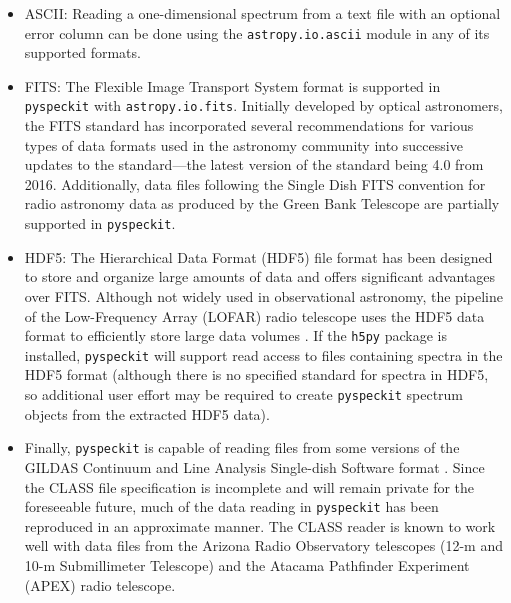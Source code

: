 \documentclass[twocolumn]{aastex62}
\newcommand{\pyspeckit}{\texttt{pyspeckit}\xspace}
\begin{document}
\begin{itemize}
    \item ASCII: Reading a one-dimensional spectrum from a text file with an optional
        error column can
	be done using the \texttt{astropy.io.ascii} module in any of its supported
	formats.  
    \item FITS: The Flexible Image Transport System \citep[FITS;][]{Pence2010a} format is
	supported in \pyspeckit with \texttt{astropy.io.fits}.  Initially developed
	by optical astronomers, the FITS standard has incorporated several
	recommendations for various types of data formats used in the astronomy
	community into successive updates to the standard---the latest version of the
	standard being 4.0 from 2016.  Additionally, data files following the Single
	Dish FITS \citep[SDFITS;][]{Garwood2000a} convention for radio astronomy data as
	produced by the Green Bank Telescope are partially supported in \pyspeckit.
    \item HDF5: The Hierarchical Data Format (HDF5) file format has been
        designed to store and organize large amounts of data and offers
        significant advantages over FITS\@.  Although not widely used in
        observational astronomy, the pipeline of the Low-Frequency Array
        (LOFAR) radio telescope uses the HDF5 data format to efficiently store
        large data volumes \citep{Alexov2012a}.  If the \texttt{h5py} package
        is installed, \pyspeckit will support read access to files containing
        spectra in the HDF5 format (although there is no specified standard for
        spectra in HDF5, so additional user effort may be required to create
        \pyspeckit spectrum objects from the extracted HDF5 data).
    \item Finally, \pyspeckit is capable of reading files from some versions of
        the GILDAS Continuum and Line Analysis Single-dish Software format
        \citep[CLASS;][]{Gildas-Team2013a}.  Since the CLASS file specification
        is incomplete and will remain private for the foreseeable future, much
        of the data reading in \pyspeckit has been reproduced in an approximate
        manner.  
        The CLASS reader is known to work well with data files from
        the Arizona Radio Observatory telescopes (12-m and 10-m Submillimeter
        Telescope) and the Atacama Pathfinder Experiment (APEX) radio
        telescope. 
\end{itemize}
\end{document}
